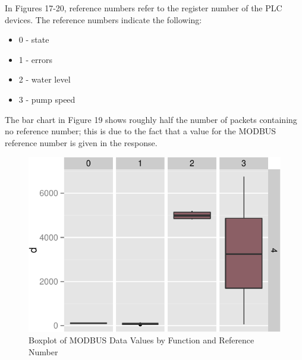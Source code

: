 \documentclass[11pt,]{article}
\begin{document}
In Figures 17-20, reference numbers refer to the register number of the
PLC devices. The reference numbers indicate the following:

\begin{itemize}
\itemsep1pt\parskip0pt
\item
  0 - state
\item
  1 - errors
\item
  2 - water level
\item
  3 - pump speed
\end{itemize}

The bar chart in Figure 19 shows roughly half the number of packets
containing no reference number; this is due to the fact that a value for
the MODBUS reference number is given in the response.

\begin{figure}[h]

{\centering \includegraphics{thesis_files/figure-latex/unnamed-chunk-32-1} 

}

\caption{Boxplot of MODBUS Data Values by Function and Reference Number}\label{fig:unnamed-chunk-32}
\end{figure}
\end{document}
